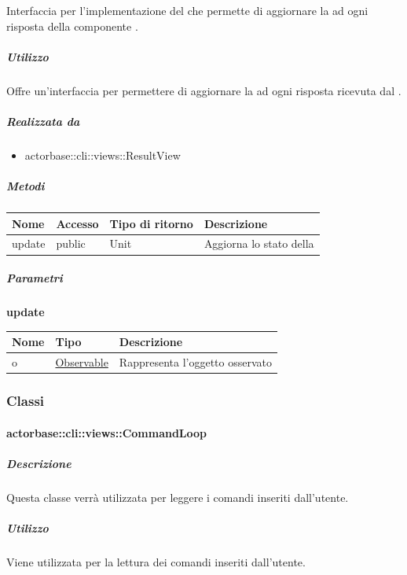 \documentclass{scalatekids-article}
\begin{document}
Interfaccia per l'implementazione del  
che permette di aggiornare la  ad ogni risposta della componente
.

\subparagraph{Utilizzo}

Offre un'interfaccia per permettere di aggiornare la  ad ogni
risposta ricevuta dal .

\subparagraph{Realizzata da}

\begin{itemize}
	\item actorbase::cli::views::ResultView
\end{itemize}

\subparagraph{Metodi}

\begin{tabular}{| l | l | l | l |}
	\hline
	Nome & Accesso & Tipo di ritorno & Descrizione\\
	\hline
	update & public & Unit & Aggiorna lo stato della \gloss{view}\\
	\hline
\end{tabular}

\subparagraph{Parametri}

\begin{center}
	\textbf{update}
\end{center}
\begin{tabular}{| l | l | l |}
	\hline
	Nome & Tipo & Descrizione\\
	\hline
	o & \hyperref[actorbase::cli::models::Observable]{Observable} & Rappresenta l'oggetto osservato\\
	\hline
\end{tabular}

\subsubsection{Classi}

\paragraph{actorbase::cli::views::CommandLoop}
\label{sec:actorbase::cli::views::CommandLoop}

\subparagraph{Descrizione}

Questa classe verrà utilizzata per leggere i comandi inseriti dall'utente.

\subparagraph{Utilizzo}

Viene utilizzata per la lettura dei comandi inseriti dall'utente.
\end{document}
